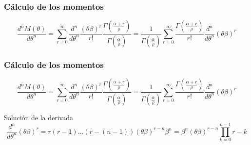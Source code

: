 \begin{frame}
    \frametitle{Cálculo de los momentos}

    \begin{equation*}
        \frac{d^n M(\theta)}{d \theta^n}
        =  \sum_{r=0}^{\infty} \frac{d^n}{d\theta^n} \frac{(\theta \beta)^r}{r!}
           \frac{\Gamma \left (\frac{\alpha+r}{\rho} \right)}{\Gamma \left ( \frac{\alpha}{\rho} \right)}
        = \frac{1}{{\Gamma \left ( \frac{\alpha}{\rho} \right)}} \sum_{r=0}^{\infty} \frac{\Gamma \left (\frac{\alpha+r}{\rho} \right)}{r!}
          \frac{d^n}{d\theta^n} (\theta \beta)^r
    \end{equation*}
\end{frame}

\begin{frame}
    \frametitle{Cálculo de los momentos}

    \begin{equation*}
        \frac{d^n M(\theta)}{d \theta^n}
        =  \sum_{r=0}^{\infty} \frac{d^n}{d\theta^n} \frac{(\theta \beta)^r}{r!}
           \frac{\Gamma \left (\frac{\alpha+r}{\rho} \right)}{\Gamma \left ( \frac{\alpha}{\rho} \right)}
        = \frac{1}{{\Gamma \left ( \frac{\alpha}{\rho} \right)}} \sum_{r=0}^{\infty} \frac{\Gamma \left (\frac{\alpha+r}{\rho} \right)}{r!}
          \frac{d^n}{d\theta^n} (\theta \beta)^r
    \end{equation*}

    \begin{block}{Solución de la derivada}
    \setlength\abovedisplayskip{0pt}
    \begin{equation*}
        \frac{d^n}{d\theta^n} (\theta \beta)^r = r(r-1)...(r-(n-1)) (\theta \beta)^{r-n} \beta^{n} = \beta^{n} (\theta \beta)^{r-n} \prod_{k=0}^{n-1} r-k
    \end{equation*}
    \end{block}
\end{frame}

